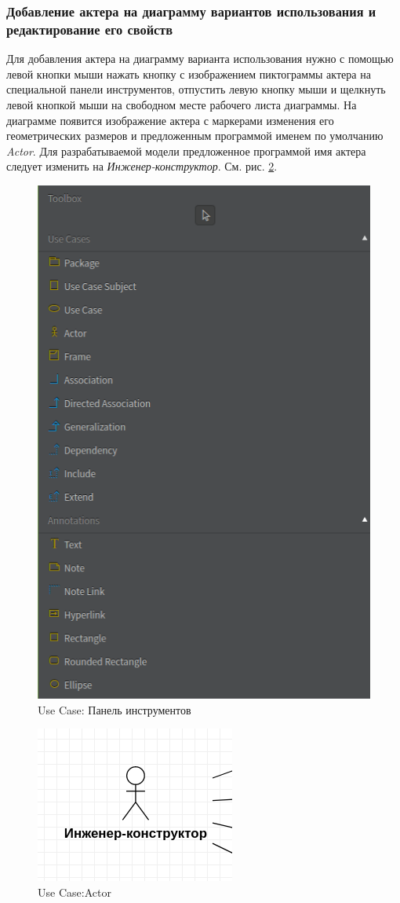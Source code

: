 \documentclass[a4paper,12pt]{extreport}
\begin{document}
\subsubsection*{Добавление актера на диаграмму вариантов использования и редактирование его свойств}
Для добавления актера на диаграмму варианта использования нужно с помощью левой кнопки мыши нажать кнопку с изображением пиктограммы актера на специальной панели инструментов, отпустить левую кнопку мыши и щелкнуть левой кнопкой мыши на свободном месте рабочего листа диаграммы. На диаграмме появится изображение актера с маркерами изменения его геометрических размеров и предложенным программой именем по умолчанию \textit{Actor}. Для разрабатываемой модели предложенное программой имя актера следует изменить на \textit{Инженер-конструктор}. См. рис. \ref{fig:actor1}.
\begin{figure}[h!]
	\centering
	\includegraphics[width=0.4\linewidth]{images/toolboxusecase}
	\caption{Use Case: Панель инструментов}
	\label{fig:toolboxusecase}
\end{figure}
\begin{figure}[h!]
	\centering
	\includegraphics[width=0.3\linewidth]{images/actor1}
	\caption{Use Case:Actor}
	\label{fig:actor1}
\end{figure}
\end{document}
